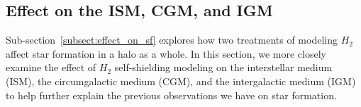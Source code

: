 \documentclass[linenumbers, twocolumn]{aastex631}
\begin{document}


\subsection{Effect on the ISM, CGM, and IGM}

Sub-section~\ref{subsect:effect_on_sf} explores how two treatments of modeling $H_{2}$ affect star formation in a halo as a whole. In this section, we more closely examine the effect of $H_{2}$ self-shielding modeling on the interstellar medium (ISM), the circumgalactic medium (CGM), and the intergalactic medium (IGM) to help further explain the previous observations we have on star formation. 
\end{document}
